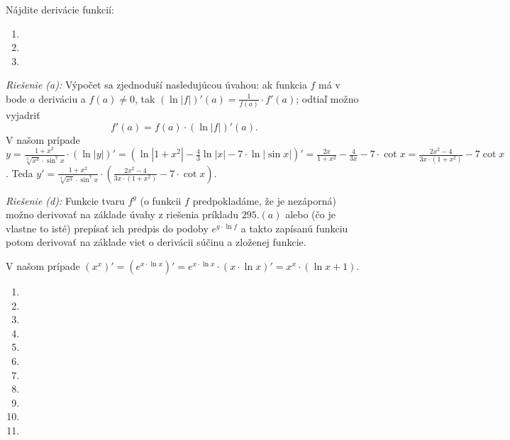 Nájdite derivácie funkcií:

\begin{enumerate}[resume]
	\item {}
	\item {}
	\item {}
\end{enumerate}

\textit{Riešenie (a):}
Výpočet sa zjednoduší nasledujúcou úvahou: ak funkcia $f$ má v bode $a$ deriváciu a $f(a)\neq 0$, tak $(\ln |f|)'(a)=\frac{1}{f(a)}\cdot f'(a)$; odtiaľ možno vyjadriť 
$$f'(a)=f(a)\cdot (\ln |f|)'(a).$$
V našom prípade $y=\frac{1+x^2}{\sqrt[3]{x^4}\cdot\sin^7 x}\cdot (\ln |y|)'=(\ln |1+x^2|-\frac{4}{3}\ln |x|-7\cdot\ln |\sin x|)'=\frac{2x}{1+x^2}-\frac{4}{3x}-7\cdot \cot x=\frac{2x^2-4}{3x\cdot (1+x^2)}-7\cot x$. Teda $y'=\frac{1+x^2}{\sqrt[3]{x^4}\cdot \sin^7 x}\cdot (\frac{2x^2-4}{3x\cdot (1+x^2)}-7\cdot\cot x)$.

\textit{Riešenie (d):}
Funkcie tvaru $f^g$ (o funkcii $f$ predpokladáme, že je nezáporná) možno derivovať na základe úvahy z riešenia príkladu $295.(a)$ alebo (čo je vlastne to isté) prepísať ich predpis do podoby $e^{g\cdot\ln f}$ a takto zapísanú funkciu potom derivovať na základe viet o derivácii súčinu a zloženej funkcie.

V našom prípade $(x^x)'=(e^{x\cdot\ln x})'=e^{x\cdot\ln x}\cdot(x\cdot\ln x)'=x^x\cdot(\ln x +1)$.
\begin{enumerate}[resume]
	\item {}
	\item {}
	\item {}
	\item {}
	\item {}
	\item {}
	\item {}
	\item {}
	\item {}
	\item {}
	\item {}
\end{enumerate}

